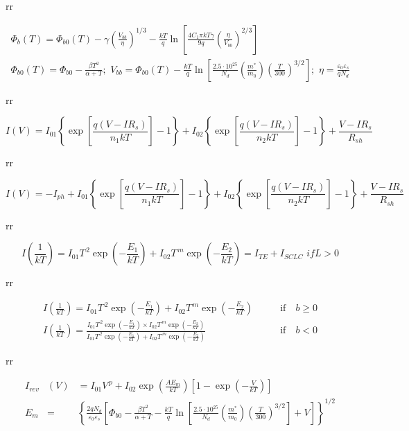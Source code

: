 \documentclass[14pt]{article}
\numberwithin{equation}{part}
\begin{document}
rr

\begin{eqnarray*}
  \Phi_b(T)= \Phi_{b0}(T)-\gamma\left(\frac{V_{bb}}{\eta}\right)^{1/3}-\frac{kT}{q}\ln\left[
   \frac{4C_1\pi kT\gamma}{9q}\left(\frac{\eta}{V_{bb}}\right)^{2/3}\right]
 \\
   \Phi_{b0}(T)=\Phi_{b0}-\frac{\beta T^2}{\alpha+T};\,\,
   V_{bb}= \Phi_{b0}(T)-\frac{kT}{q}\ln\left[\frac{2.5\cdot10^{25}}{N_d}\left(\frac{m^*}{m_0}\right)
     \left(\frac{T}{300}\right)^{3/2}\right];\,\,
   \eta=\frac{\varepsilon_0\varepsilon_s}{qN_d}
\end{eqnarray*}

rr

\begin{equation*}
    I(V)=I_{01}\left\{\exp \left[\frac{q(V-IR_s)}{n_1kT}\right]-1\right\}+I_{02}\left\{\exp \left[\frac{q(V-IR_s)}{n_2kT}\right]-1\right\}+\frac{V-IR_s}{R_{sh}}
\end{equation*}

rr


\begin{equation*}
    I(V)=-I_{ph}+I_{01}\left\{\exp \left[\frac{q(V-IR_s)}{n_1kT}\right]-1\right\}+I_{02}\left\{\exp \left[\frac{q(V-IR_s)}{n_2kT}\right]-1\right\}+\frac{V-IR_s}{R_{sh}}
\end{equation*}

rr

\begin{equation*}
    I\left(\frac{1}{kT}\right)=I_{01}T^{\,2}\exp\left(-\frac{E_1}{kT}\right)+
       I_{02}T^{\,m}\exp\left(-\frac{E_2}{kT}\right)=I_{TE}+I_{SCLC} \,\, if L>0
\end{equation*}

rr


\begin{eqnarray*}
    I\left(\frac{1}{kT}\right)=I_{01}T^{\,2}\exp\left(-\frac{E_1}{kT}\right)+
       I_{02}T^{\,m}\exp\left(-\frac{E_2}{kT}\right)& \qquad \mbox{if}\quad b\geq0 \\
    I\left(\frac{1}{kT}\right)=\frac{I_{01}T^{\,2}\exp\left(-\frac{E_1}{kT}\right)\times I_{02}T^{\,m}\exp\left(-\frac{E_2}{kT}\right)}
    {I_{01}T^{\,2}\exp\left(-\frac{E_1}{kT}\right)+ I_{02}T^{\,m}\exp\left(-\frac{E_2}{kT}\right)}&\qquad \mbox{if}\quad b<0
\end{eqnarray*}


rr


\begin{eqnarray*}
    I_{rev}&(V)&=I_{01}V^{\,p}+I_{02}\exp\left(\frac{AE_m}{kT}\right)\left[1-\exp\left(-\frac{V}{kT}\right)\right] \\
    E_m&=&\left\{\frac{2qN_d}{\varepsilon_0\varepsilon_s}\left[\Phi_{b0}-\frac{\beta T^2}{\alpha+T}-\frac{kT}{q}\ln\left[\frac{2.5\cdot10^{25}}{N_d}\left(\frac{m^*}{m_0}\right)
     \left(\frac{T}{300}\right)^{3/2}\right]+V\right]\right\}^{1/2}
\end{eqnarray*}
\end{document}
